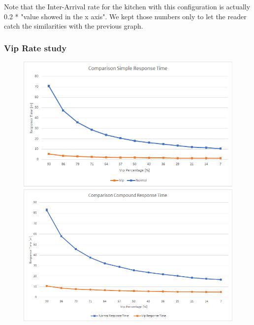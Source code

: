 Note that the Inter-Arrival rate for the kitchen with this configuration is actually 0.2 * "value showed in the x axis". We kept those numbers only to let the reader catch the similarities with the previous graph. %

\subsubsection{Vip Rate study}

\begin{figure}[h!]
  \begin{minipage}{0.48\textwidth}
    \centering
    \includegraphics[width=\textwidth]{figs/comparisonSimpleResponseTime.png}
    \caption{} %
    \label{}
  \end{minipage}\hspace{0.03\textwidth}
  \begin{minipage}{0.48\textwidth}
    \centering
    \includegraphics[width=\textwidth]{figs/comparisonCompoundResponseTime.png}
    \caption{} %
    \label{}
  \end{minipage}
\end{figure}

